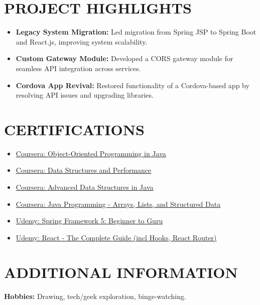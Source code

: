 \documentclass[a4paper,10pt]{article}
\begin{document}
\section*{PROJECT HIGHLIGHTS}
\begin{itemize}
    \item \textbf{Legacy System Migration:} Led migration from Spring JSP to Spring Boot and React.js, improving system scalability.
    \item \textbf{Custom Gateway Module:} Developed a CORS gateway module for seamless API integration across services.
    \item \textbf{Cordova App Revival:} Restored functionality of a Cordova-based app by resolving API issues and upgrading libraries.
\end{itemize}

\section*{CERTIFICATIONS}
\begin{itemize}
    \item \href{https://coursera.org/share/9f1ce6e8c3f273a8ff03d12ad8057f70}{Coursera: Object-Oriented Programming in Java}
    \item \href{https://coursera.org/share/84ee36630fdd16172567fbb34e469713}{Coursera: Data Structures and Performance}
    \item \href{https://coursera.org/share/35ddbc5f8df6cda6ba36bf3131ef95b4}{Coursera: Advanced Data Structures in Java}
    \item \href{https://coursera.org/share/1689f948d59f11ab7f3787cb24950752}{Coursera: Java Programming - Arrays, Lists, and Structured Data}
    \item \href{https://www.udemy.com/certificate/UC-bebb1e45-879e-4c04-adca-88a74ea59270/}{Udemy: Spring Framework 5: Beginner to Guru}
    \item \href{https://www.udemy.com/certificate/UC-dc7ef6ad-f1f6-45ff-8636-5991b096e40b/}{Udemy: React - The Complete Guide (incl Hooks, React Router)}
\end{itemize}

\section*{ADDITIONAL INFORMATION}
\noindent
\textbf{Hobbies:} Drawing, tech/geek exploration, binge-watching.
\end{document}
